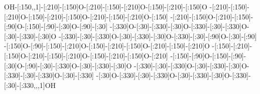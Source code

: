 OH-[:150,,1]-[:210]-[:150]O-[:210]-[:150]-[:210]O-[:150]-[:210]-[:150]O%
-[:210]-[:150]-[:210]O-[:150]-[:210]-[:150]O-[:210]-[:150]-[:210]O-[:150]%
-[:210]-[:150]O-[:210]-[:150]-[:90]O-[:150]-[:90]-[:30]O-[:90]-[:30]%
-[:330]O-[:30]-[:330]-[:30]O-[:330]-[:30]-[:330]O-[:30]-[:330]-[:30]O%
-[:330]-[:30]-[:330]O-[:30]-[:330]-[:30]O-[:330]-[:30]-[:90]O-[:30]-[:90]%
-[:150]O-[:90]-[:150]-[:210]O-[:150]-[:210]-[:150]O-[:210]-[:150]-[:210]O%
-[:150]-[:210]-[:150]O-[:210]-[:150]-[:210]O-[:150]-[:210]-[:150]O-[:210]%
-[:150]-[:90]O-[:150]-[:90]-[:30]O-[:90]-[:30]-[:330]O-[:30]-[:330]-[:30]O%
-[:330]-[:30]-[:330]O-[:30]-[:330]-[:30]O-[:330]-[:30]-[:330]O-[:30]-[:330]%
-[:30]O-[:330]-[:30]-[:330]O-[:30]-[:330]-[:30]O-[:330]-[:30]-[:330,,,1]OH